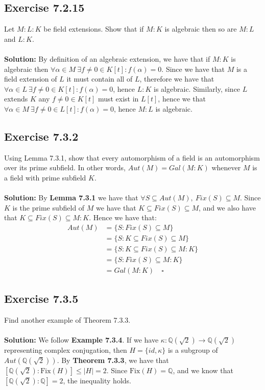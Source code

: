 \documentclass{article}
\begin{document}
\subsection*{Exercise 7.2.15}
Let $M:L:K$ be field extensions. Show that if $M:K$ is algebraic then so are $M:L$ and $L:K$.
\\\\
\textbf{Solution:}
By definition of an algebraic extension, we have that if $M:K$ is algebraic then $\forall \alpha \in M \ \exists f \neq 0 \in K[t] : f(\alpha)=0$. Since we have that $M$ is a field extension of $L$
it must contain all of $L$, therefore we have that $\forall \alpha \in L \ \exists f \neq 0 \in K[t]: f(\alpha)=0$, hence $L:K$ is algebraic. Similarly, since $L$ extends $K$
any $f \neq 0 \in K[t]$ must exist in $L[t]$, hence we that $\forall \alpha \in M \ \exists f \neq 0 \in L[t]: f(\alpha)=0$, hence $M:L$ is algebraic.

\subsection*{Exercise 7.3.2}
Using Lemma 7.3.1, show that every automorphism of a field is an automorphism over its prime subfield. In other words,
$Aut(M) = Gal(M:K)$ whenever $M$ is a field with prime subfield $K$.
\\\\
\textbf{Solution:}
By \textbf{Lemma 7.3.1} we have that $\forall S \subseteq Aut(M), \ Fix(S) \subseteq M$. Since $K$ is the prime subfield of $M$ we have that $K \subseteq Fix(S) \subseteq M$, and we also have that $K \subseteq Fix(S) \subseteq M:K$. Hence we have that:
\begin{equation*}
    \begin{aligned}
        Aut(M) &= \{ S: Fix(S) \subseteq M\}\\
        &= \{S: K \subseteq Fix(S) \subseteq M \}\\
        &= \{S: K \subseteq Fix(S) \subseteq M:K\}\\
        &= \{S: Fix(S) \subseteq M:K\}\\
        &= Gal (M:K) \quad \square
    \end{aligned}
\end{equation*}

\subsection*{Exercise 7.3.5}
Find another example of Theorem 7.3.3.
\\\\
\textbf{Solution:}
We follow \textbf{Example 7.3.4}. If we have $\kappa: \mathbb{Q}(\sqrt2) \rightarrow \mathbb{Q}(\sqrt2)$ representing complex conjugation,
then $H=\{id, \kappa\}$ is a subgroup of $Aut(\mathbb{Q}(\sqrt2))$. By \textbf{Theorem 7.3.3}, we have that $[\mathbb{Q}(\sqrt2): \text{Fix}(H)] \le |H| = 2$.
Since $\text{Fix}(H) = \mathbb{Q}$, and we know that $[\mathbb{Q}(\sqrt2):\mathbb{Q}]=2$, the inequality holds.
\end{document}
